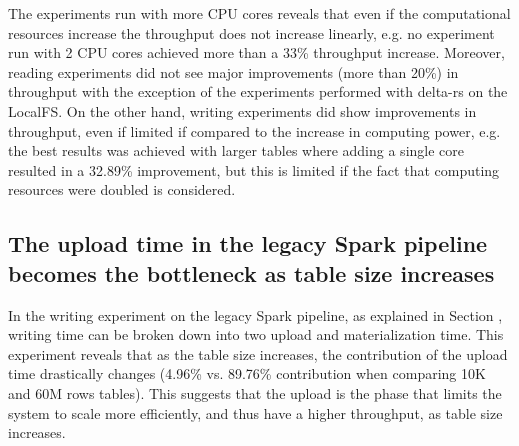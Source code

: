 The experiments run with more \gls{CPU} cores reveals that even if the computational resources increase the throughput does not increase linearly, e.g. no experiment run with 2 \gls{CPU} cores achieved more than a 33\% throughput increase. Moreover, reading experiments did not see major improvements (more than 20\%) in throughput with the exception of the experiments performed with delta-rs on the \gls{LocalFS}. On the other hand, writing experiments did show improvements in throughput, even if limited if compared to the increase in computing power, e.g. the best results was achieved with larger tables where adding a single core resulted in a 32.89\% improvement, but this is limited if the fact that computing resources were doubled is considered.

\subsection{The upload time in the legacy Spark pipeline becomes the bottleneck as table size increases}

In the writing experiment on the legacy Spark pipeline, as explained in Section , writing time can be broken down into two upload and materialization time. This experiment reveals that as the table size increases, the contribution of the upload time drastically changes (4.96\% vs. 89.76\% contribution when comparing 10K and 60M rows tables). This suggests that the upload is the phase that limits the system to scale more efficiently, and thus have a higher throughput, as table size increases.